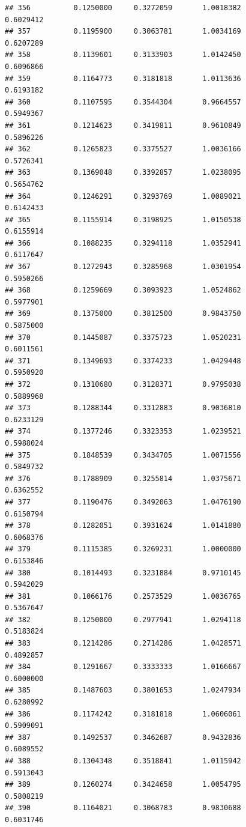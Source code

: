 \documentclass[]{article}
\begin{document}
\begin{verbatim}
## 356          0.1250000     0.3272059       1.0018382          0.6029412
## 357          0.1195900     0.3063781       1.0034169          0.6207289
## 358          0.1139601     0.3133903       1.0142450          0.6096866
## 359          0.1164773     0.3181818       1.0113636          0.6193182
## 360          0.1107595     0.3544304       0.9664557          0.5949367
## 361          0.1214623     0.3419811       0.9610849          0.5896226
## 362          0.1265823     0.3375527       1.0036166          0.5726341
## 363          0.1369048     0.3392857       1.0238095          0.5654762
## 364          0.1246291     0.3293769       1.0089021          0.6142433
## 365          0.1155914     0.3198925       1.0150538          0.6155914
## 366          0.1088235     0.3294118       1.0352941          0.6117647
## 367          0.1272943     0.3285968       1.0301954          0.5950266
## 368          0.1259669     0.3093923       1.0524862          0.5977901
## 369          0.1375000     0.3812500       0.9843750          0.5875000
## 370          0.1445087     0.3375723       1.0520231          0.6011561
## 371          0.1349693     0.3374233       1.0429448          0.5950920
## 372          0.1310680     0.3128371       0.9795038          0.5889968
## 373          0.1288344     0.3312883       0.9036810          0.6233129
## 374          0.1377246     0.3323353       1.0239521          0.5988024
## 375          0.1848539     0.3434705       1.0071556          0.5849732
## 376          0.1788909     0.3255814       1.0375671          0.6362552
## 377          0.1190476     0.3492063       1.0476190          0.6150794
## 378          0.1282051     0.3931624       1.0141880          0.6068376
## 379          0.1115385     0.3269231       1.0000000          0.6153846
## 380          0.1014493     0.3231884       0.9710145          0.5942029
## 381          0.1066176     0.2573529       1.0036765          0.5367647
## 382          0.1250000     0.2977941       1.0294118          0.5183824
## 383          0.1214286     0.2714286       1.0428571          0.4892857
## 384          0.1291667     0.3333333       1.0166667          0.6000000
## 385          0.1487603     0.3801653       1.0247934          0.6280992
## 386          0.1174242     0.3181818       1.0606061          0.5909091
## 387          0.1492537     0.3462687       0.9432836          0.6089552
## 388          0.1304348     0.3518841       1.0115942          0.5913043
## 389          0.1260274     0.3424658       1.0054795          0.5808219
## 390          0.1164021     0.3068783       0.9830688          0.6031746

\end{verbatim}
\end{document}
